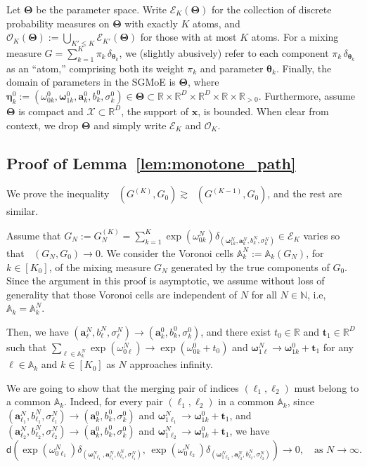 \documentclass[twoside]{article}
\DeclareMathOperator*{\VDFRA}{D_{FRA}}
\newcommand{\divclus}{\mathsf{d}}
\theoremstyle{plain}
\theoremstyle{definition}
\theoremstyle{plain}
\def\rvx{{\mathbf{x}}}
\def\vtheta{{\bm{\theta}}}
\def\vTheta{{\bm{\Theta}}}
\def\veta{{\bm{\eta}}}
\def\vomega{{\bm{\omega}}}
\def\va{{\bm{a}}}
\def\vt{{\bm{t}}}
\def\sA{{\mathbb{A}}}
\newcommand{\R}{\mathbb{R}}
\newcommand{\cE}{\mathcal{E}}
\newcommand{\cO}{\mathcal{O}}
\newcommand{\cX}{\mathcal{X}}
\begin{document}
Let \(\vTheta\) be the parameter space.
Write \(\cE_K(\vTheta)\) for the collection of discrete probability measures on \(\vTheta\) with exactly \(K\) atoms, and \(\cO_K(\vTheta):=\bigcup_{K'\le K}\cE_{K'}(\vTheta)\) for those with at most \(K\) atoms.
For a mixing measure \(G=\sum_{k=1}^{K}\pi_k\,\delta_{\vtheta_k}\), we (slightly abusively) refer to each component \(\pi_k\,\delta_{\vtheta_k}\) as an “atom,” comprising both its weight \(\pi_k\) and parameter \(\vtheta_k\). Finally, the domain of parameters in the SGMoE is \(\vTheta\), where \(\veta_{k}^{0}:=(\omega_{0k}^{0}, \vomega_{1k}^{0}, \va_{k}^{0}, b_{k}^{0}, \sigma_{k}^{0})
\in \vTheta \subset \R \times \R^{D} \times \R^{D} \times \R \times \R_{>0}\). Furthermore, assume \(\vTheta\) is compact and \(\cX\subset\R^{D}\), the support of \(\rvx\), is bounded. When clear from context, we drop \(\vTheta\) and simply write \(\cE_K\) and \(\cO_K\).



\subsection{Proof of Lemma~\ref{lem:monotone_path}}

     We prove the inequality $\VDFRA (G^{(K)}, G_0) \gtrsim \VDFRA (G^{(K - 1)}, G_0)$, and the rest are similar.

     Assume that $G_N := G_N^{(K)} = \sum_{k = 1}^{K}  \exp(\omega_{0k}^{N}) \delta_{(\vomega_{1k}^{N}, \va^N_k, b^N_k, \sigma^N_k)} \in \cE_{K}$ varies so that $\VDFRA (G_N, G_0) \to 0$. We consider the Voronoi cells $\sA_k^N := \sA_k(G_N)$, for $k \in [K_0]$, of the mixing measure $G_N$ generated by the true components of $G_0$. Since the argument in this proof is asymptotic, we assume without loss of generality that those Voronoi cells are independent of $N$ for all $N \in \mathbb{N}$, i.e, $\sA_k = \sA^N_k$.
     
     Then, we have $(\va_{\ell}^N, b_{\ell}^N, \sigma_{\ell}^N) \to (\va_k^0, b_k^0, \sigma_k^0)$, and there exist $t_0 \in \mathbb{R}$ and $\vt_1 \in \mathbb{R}^D$ such that $\sum\limits_{\ell \in \sA_k^N} \exp{(\omega_{0 \ell}^N)} \to \exp{(\omega_{0k}^0 + t_0)}$ and $\vomega_{1\ell}^N \to \vomega_{1k}^0 + \vt_1$ for any $\ell \in \sA_k$ and $k \in [K_0]$ as $N$ approaches infinity. 
     
     We are going to show that the merging pair of indices $(\ell_1, \ell_2)$ must belong to a common $\sA_k$. 
Indeed, for every pair $(\ell_1, \ell_2)$ in a common $\sA_k$, 
since $(\va_{\ell_1}^N, b_{\ell_1}^N, \sigma_{\ell_1}^N) \to (\va_k^0, b_k^0, \sigma_k^0)$ and 
$\vomega_{1\ell_1}^N \to \vomega_{1k}^0 + \vt_1$, 
and $(\va_{\ell_2}^N, b_{\ell_2}^N, \sigma_{\ell_2}^N) \to (\va_k^0, b_k^0, \sigma_k^0)$ and 
$\vomega_{1\ell_2}^N \to \vomega_{1k}^0 + \vt_1$, 
we have 
$$
\divclus \left( 
   \exp(\omega_{0\ell_1}^{N}) \delta_{(\vomega_{1\ell_1}^{N}, \va_{\ell_1}^N, b_{\ell_1}^N, \sigma_{\ell_1}^N)}, \,
   \exp(\omega_{0\ell_2}^{N}) \delta_{(\vomega_{1\ell_2}^{N}, \va_{\ell_2}^N, b_{\ell_2}^N, \sigma_{\ell_2}^N)} 
\right) \to 0, 
\quad \text{as $N \to \infty$}.
$$
\end{document}

